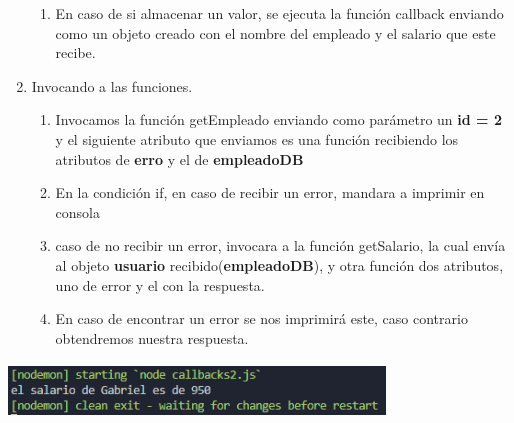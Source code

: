 \documentclass{report}
\begin{document}
\begin{enumerate}
\begin{enumerate}
     \item En caso de si almacenar un valor, se ejecuta la función callback enviando como un objeto creado con el nombre del empleado y el salario que este recibe.
     \end{enumerate}
     \item Invocando a las funciones.
     
     \begin{enumerate}
        \item Invocamos la función getEmpleado enviando como parámetro un \textbf{id = 2} y el siguiente atributo que enviamos es una función recibiendo los atributos de \textbf{erro} y el de \textbf{empleadoDB}
         \item En la condición if, en caso de recibir un error, mandara a imprimir en consola
         \item caso de no recibir un error, invocara a la función getSalario, la cual envía al objeto \textbf{usuario} recibido(\textbf{empleadoDB}), y otra función dos atributos, uno de error y el con la respuesta.
         \item En caso de encontrar un error se nos imprimirá este, caso contrario obtendremos nuestra respuesta.
     \end{enumerate}
\end{enumerate}
\begin{center}
  \includegraphics[width=10cm, height=1.5cm]{10.PNG}
\end{center}
\end{document}
